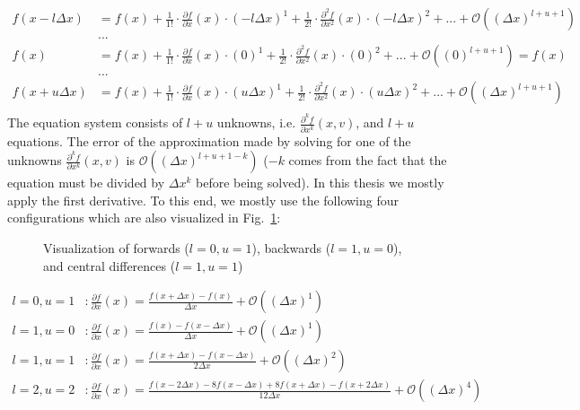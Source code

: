 \begin{align*}
f(x - l \Delta x) &= f(x) + \frac{1}{1!}\cdot\frac{\partial f}{\partial x}(x)\cdot (-l\Delta x)^1 + \frac{1}{2!}\cdot\frac{\partial^2 f}{\partial x^2}(x)\cdot (-l\Delta x)^2 + ... + \mathcal{O}((\Delta x) ^{l+u+1})\\
&...\\
f(x) &= f(x) + \frac{1}{1!}\cdot\frac{\partial f}{\partial x}(x)\cdot (0)^1 + \frac{1}{2!}\cdot\frac{\partial^2 f}{\partial x^2}(x)\cdot (0)^2 + ... + \mathcal{O}((0) ^{l+u+1})= f(x)\\
&...\\
f(x + u \Delta x) &= f(x) + \frac{1}{1!}\cdot\frac{\partial f}{\partial x}(x)\cdot (u\Delta x)^1 + \frac{1}{2!}\cdot\frac{\partial^2 f}{\partial x^2}(x)\cdot (u\Delta x)^2 + ... + \mathcal{O}((\Delta x) ^{l+u+1})\\
\end{align*}
The equation system consists of $l+u$ unknowns, i.e. $\frac{\partial^k f}{\partial x^k}(x,v)$, and $l+u$ equations.
The error of the approximation made by solving for one of the unknowns $\frac{\partial^k f}{\partial x^k}(x,v)$ is $\mathcal{O}((\Delta x) ^{l+u+1-k})$ ($-k$ comes from the fact that the equation must be divided by $\Delta x ^k$ before being solved).
In this thesis we mostly apply the first derivative.
To this end, we mostly use the following four configurations which are also visualized in Fig.~\ref{fig:finite_differences}:

\begin{figure}[!h]
    \caption{Visualization of forwards ($l=0,u=1$), backwards ($l=1,u=0$), and central differences ($l=1,u=1$)}
    \label{fig:finite_differences}
\end{figure}

\begin{align*}
l=0,u=1&: \frac{\partial f}{\partial x}(x) = \frac{f(x+\Delta x) - f(x)}{\Delta x} + \mathcal{O}((\Delta x)^{1})\\
l=1,u=0&: \frac{\partial f}{\partial x}(x) = \frac{f(x) - f(x-\Delta x)}{\Delta x} + \mathcal{O}((\Delta x)^{1})\\
l=1,u=1&: \frac{\partial f}{\partial x}(x) = \frac{f(x + \Delta x) - f(x-\Delta x)}{2\Delta x} + \mathcal{O}((\Delta x)^{2})\\
l=2,u=2&: \frac{\partial f}{\partial x}(x) = \frac{f(x-2\Delta x) -8 f(x-\Delta x) + 8 f(x+\Delta x) - f(x+2\Delta x)}{12\Delta x} + \mathcal{O}((\Delta x)^{4})\\
\end{align*}


